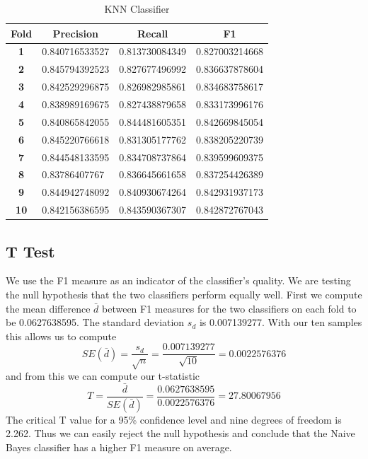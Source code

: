 \documentclass[paper=a4, fontsize=11pt]{jhwhw} %
\begin{document}
\begin{table}[ht]
\centering
\caption{KNN Classifier}
\label{my-label}
\begin{tabular}{|c|l|l|l|}
\hline
\textbf{Fold} & \multicolumn{1}{c|}{\textbf{Precision}} & \multicolumn{1}{c|}{\textbf{Recall}} & \multicolumn{1}{c|}{\textbf{F1}} \\ \hline
\textbf{1}    & 0.840716533527                          & 0.813730084349                       & 0.827003214668                   \\ \hline
\textbf{2}    & 0.845794392523                          & 0.827677496992                       & 0.836637878604                   \\ \hline
\textbf{3}    & 0.842529296875                          & 0.826982985861                       & 0.834683758617                   \\ \hline
\textbf{4}    & 0.838989169675                          & 0.827438879658                       & 0.833173996176                   \\ \hline
\textbf{5}    & 0.840865842055                          & 0.844481605351                       & 0.842669845054                   \\ \hline
\textbf{6}    & 0.845220766618                          & 0.831305177762                       & 0.838205220739                   \\ \hline
\textbf{7}    & 0.844548133595                          & 0.834708737864                       & 0.839599609375                   \\ \hline
\textbf{8}    & 0.83786407767                           & 0.836645661658                       & 0.837254426389                   \\ \hline
\textbf{9}    & 0.844942748092                          & 0.840930674264                       & 0.842931937173                   \\ \hline
\textbf{10}   & 0.842156386595                          & 0.843590367307                       & 0.842872767043                   \\ \hline
\end{tabular}
\end{table}

\subsection{T Test}
We use the F1 measure as an indicator of the classifier's quality. We are testing the null hypothesis that the two classifiers perform equally well. First we compute the mean difference $\bar d$ between F1 measures for the two classifiers on each fold to be 0.0627638595. The standard deviation $s_{d}$ is 0.007139277. With our ten samples this allows us to compute
$$SE(\bar d) = \frac{s_d}{\sqrt{n}} = \frac{0.007139277}{\sqrt{10}} = 0.0022576376$$
and from this we can compute our t-statistic
$$T = \frac{\bar d}{SE(\bar d)} = \frac{0.0627638595}{0.0022576376} = 27.80067956$$
The critical T value for a 95\% confidence level and nine degrees of freedom is 2.262. Thus we can easily reject the null hypothesis and conclude that the Naive Bayes classifier has a higher F1 measure on average.
\end{document}
